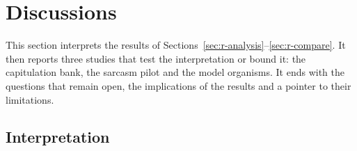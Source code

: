 \section{Discussions}
\label{sec:r-discuss}

This section interprets the results of Sections~\ref{sec:r-analysis}--\ref{sec:r-compare}.
It then reports three studies that test the interpretation or bound it: the capitulation bank, the sarcasm pilot and the model organisms.
It ends with the questions that remain open, the implications of the results and a pointer to their limitations.

\subsection{Interpretation}
\label{sec:r-interp}

